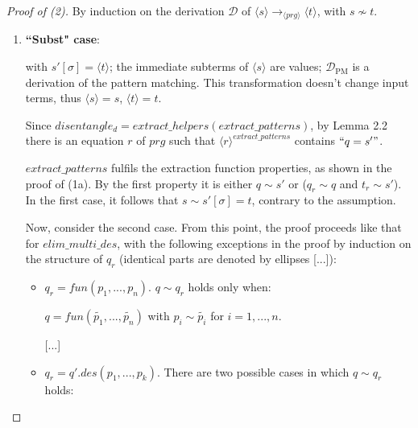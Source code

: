 \documentclass[11pt]{article} %
\begin{document}
\begin{proof}[Proof of (2)] By induction on the derivation $\mathcal{D}$ of $\langle s \rangle \longrightarrow_{\langle prg \rangle} \langle t \rangle$, with $s \not\sim t$.

\begin{enumerate}
\item \textbf{``Subst" case}:

\begin{prooftree}
\end{prooftree}

with $s'[\sigma] = \langle t \rangle$; the immediate subterms of $\langle s \rangle$ are values; $\mathcal{D}_{\textrm{PM}}$ is a derivation of the pattern matching. This transformation doesn't change input terms, thus $\langle s \rangle = s$, $\langle t \rangle = t$.

Since $disentangle_d = extract\_helpers(extract\_patterns)$, by Lemma 2.2 there is an equation $r$ of $prg$ such that $\langle r \rangle^{extract\_patterns}$ contains $`` q = s' "$.

$extract\_patterns$ fulfils the extraction function properties, as shown in the proof of (1a). By the first property it is either $q \sim s'$ or ($q_r \sim q$ and $t_r \sim s'$). In the first case, it follows that $s \sim s'[\sigma] = t$, contrary to the assumption.

Now, consider the second case. From this point, the proof proceeds like that for $elim\_multi\_des$, with the following exceptions in the proof by induction on the structure of $q_r$ (identical parts are denoted by ellipses [...]):

\begin{itemize}

\item $q_r = fun(p_1, ..., p_n)$. $q \sim q_r$ holds only when:

$q = fun(\widetilde{p_1}, ..., \widetilde{p_n})$ with $p_i \sim \widetilde{p_i}$ for $i = 1, ..., n$.

[...]

\item $q_r = q'.des(p_1, ..., p_k)$. There are two possible cases in which $q \sim q_r$ holds:

\begin{itemize}


\end{itemize}
\end{itemize}
\end{enumerate}
\end{proof}
\end{document}
